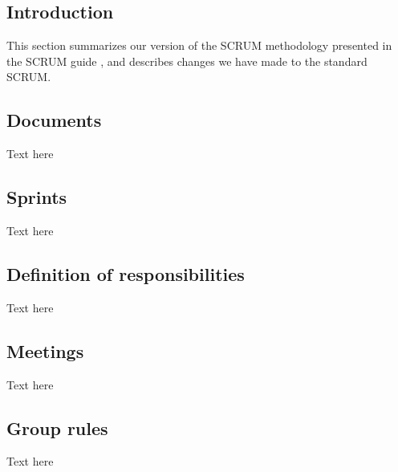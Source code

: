 
\subsection{Introduction}
This section summarizes our version of the SCRUM methodology presented in the SCRUM guide \cite{scrumGuide}, and describes changes we have made to the standard SCRUM.  

\subsection{Documents}
Text here

\subsection{Sprints}
Text here

\subsection{Definition of responsibilities}
Text here

\subsection{Meetings}
Text here

\subsection{Group rules}
Text here